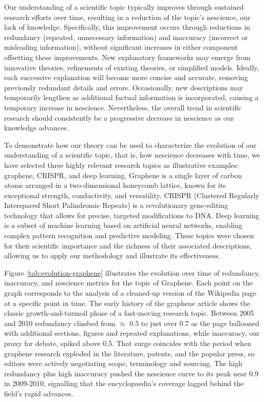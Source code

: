 Our understanding of a scientific topic typically improves through sustained research efforts over time, resulting in a reduction of the topic's nescience, our lack of knowledge. Specifically, this improvement occurs through reductions in redundancy (repeated, unnecessary information) and inaccuracy (incorrect or misleading information), without significant increases in either component offsetting these improvements. New explanatory frameworks may emerge from innovative theories, refinements of existing theories, or simplified models. Ideally, each successive explanation will become more concise and accurate, removing previously redundant details and errors. Occasionally, new descriptions may temporarily lengthen as additional factual information is incorporated, causing a temporary increase in nescience. Nevertheless, the overall trend in scientific research should consistently be a progressive decrease in nescience as our knowledge advances.

To demonstrate how our theory can be used to characterize the evolution of our understanding of a scientific topic, that is, how nescience decreases with time, we have selected three highly relevant research topics as illustrative examples: graphene, CRISPR, and deep learning. Graphene is a single layer of carbon atoms arranged in a two-dimensional honeycomb lattice, known for its exceptional strength, conductivity, and versatility. CRISPR (Clustered Regularly Interspaced Short Palindromic Repeats) is a revolutionary gene-editing technology that allows for precise, targeted modifications to DNA. Deep learning is a subset of machine learning based on artificial neural networks, enabling complex pattern recognition and predictive modeling. These topics were chosen for their scientific importance and the richness of their associated descriptions, allowing us to apply our methodology and illustrate its effectiveness.

Figure \ref{tab:evolution-graphene} illustrates the evolution over time of redundancy, inaccuracy, and nescience metrics for the topic of Graphene. Each point on the graph corresponds to the analysis of a cleaned-up version of the Wikipedia page at a specific point in time. The early history of the graphene article shows the classic growth-and-turmoil phase of a fast-moving research topic. Between 2005 and 2010 redundancy climbed from $\approx$ 0.5 to just over 0.7 as the page ballooned with additional sections, figures and repeated explanations, while inaccuracy, our proxy for debate, spiked above 0.5. That surge coincides with the period when graphene research exploded in the literature, patents, and the popular press, so editors were actively negotiating scope, terminology and sourcing. The high redundancy plus high inaccuracy pushed the nescience curve to its peak near 0.9 in 2009-2010, signalling that the encyclopaedia's coverage lagged behind the field's rapid advances.

